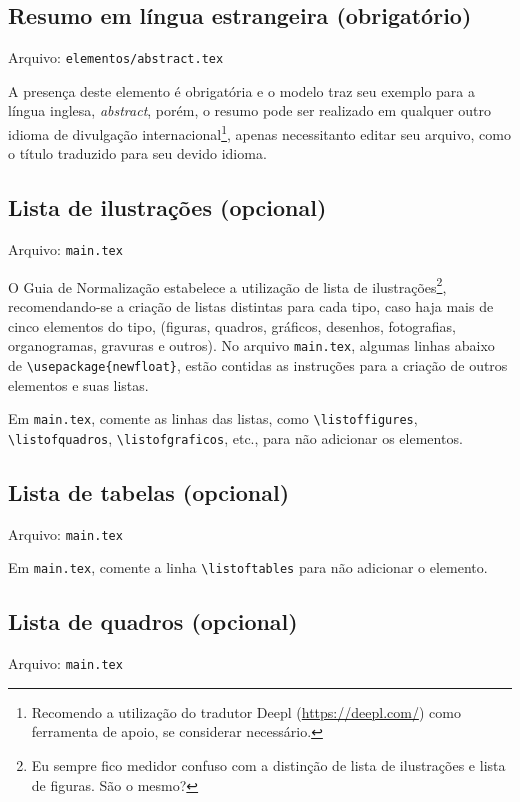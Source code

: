 \subsection{Resumo em língua estrangeira (obrigatório)}
    Arquivo: \texttt{elementos/abstract.tex}

    A presença deste elemento é obrigatória e o modelo traz seu exemplo para a língua inglesa, \textit{abstract}, porém, o resumo pode ser realizado em qualquer outro idioma de divulgação internacional\footnote{Recomendo a utilização do tradutor Deepl (\url{https://deepl.com/}) como ferramenta de apoio, se considerar necessário.}, apenas necessitanto editar seu arquivo, como o título traduzido para seu devido idioma.

\subsection{Lista de ilustrações (opcional)}
    Arquivo: \texttt{main.tex}

    O Guia de Normalização \cite{livro:iffar-guia-normalizacao-2022} estabelece a utilização de lista de ilustrações\footnote{Eu sempre fico medidor confuso com a distinção de lista de ilustrações e lista de figuras. São o mesmo?}, recomendando-se a criação de listas distintas para cada tipo, caso haja mais de cinco elementos do tipo, (figuras, quadros, gráficos, desenhos, fotografias, organogramas, gravuras e outros). No arquivo \texttt{main.tex}, algumas linhas abaixo de \verb|\usepackage{newfloat}|, estão contidas as instruções para a criação de outros elementos e suas listas.

    Em \texttt{main.tex}, comente as linhas das listas, como \verb|\listoffigures|, \\\verb|\listofquadros|, \verb|\listofgraficos|, etc., para não adicionar os elementos.

\subsection{Lista de tabelas (opcional)}
    Arquivo: \texttt{main.tex}

    Em \texttt{main.tex}, comente a linha \verb|\listoftables| para não adicionar o elemento.

\subsection{Lista de quadros (opcional)}
    Arquivo: \texttt{main.tex}

